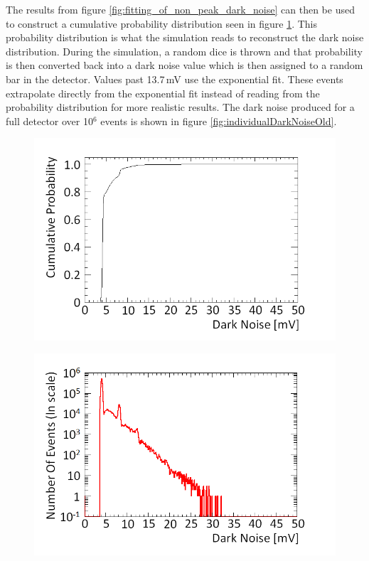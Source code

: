 The results from figure \ref{fig:fitting_of_non_peak_dark_noise} can then be used to construct a cumulative probability distribution seen in figure \ref{fig:cumulative_prob_dark}. This probability distribution is what the simulation reads to reconstruct the dark noise distribution. During the simulation, a random dice is thrown and that probability is then converted back into a dark noise value which is then assigned to a random bar in the detector. Values past 13.7\,mV use the exponential fit. These events extrapolate directly from the exponential fit instead of reading from the probability distribution for more realistic results. The dark noise produced for a full detector over 10$^6$ events is shown in figure \ref{fig:individualDarkNoiseOld}. 

\begin{figure}[!h]
\centering
\begin{minipage}{.45\textwidth}
  \centering
  \includegraphics[width=\linewidth]{Chapter4/Figs/Raster/cumulative_prob_dark_noiseMedText.png}
  \label{fig:cumulative_prob_dark}
  \vspace{0.956cm} %
\end{minipage}%
\qquad
\begin{minipage}{.45\textwidth}
  \centering
  \includegraphics[width=\linewidth]{Chapter4/Figs/darkNoiseLogMedText.png} 

\end{minipage}
\end{figure}
